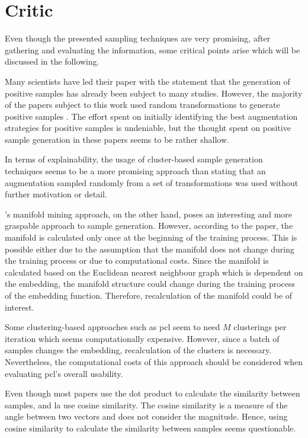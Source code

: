 \section{Critic}\label{sec:critic}

Even though the presented sampling techniques are very promising, after gathering and evaluating the information, 
some critical points arise which will be discussed in the following.

Many scientists have led their paper with the statement that the generation of positive samples has already been subject to many studies.
However, the majority of the papers subject to this work used random transformations to generate positive samples \citet{robinson_contrastive_2021,adversarial_2020,swav_2020}.
The effort spent on initially identifying the best augmentation strategies for positive samples is undeniable, 
but the thought spent on positive sample generation in these papers seems to be rather shallow.

In terms of explainability, 
the usage of cluster-based sample generation techniques seems to be a more promising approach than stating that an augmentation sampled randomly 
from a set of transformations was used without further motivation or detail.

\citet{mining_manifolds_2018}'s manifold mining approach, on the other hand, poses an interesting and more graspable approach to sample generation. 
However, according to the paper, the manifold is calculated only once at the beginning of the training process.
This is possible either due to the assumption that the manifold does not change during the training process or 
due to computational costs.
Since the manifold is calculated based on the Euclidean nearest neighbour graph which is dependent on the embedding, 
the manifold structure could change during the training process of the embedding function.
Therefore, recalculation of the manifold could be of interest.

Some clustering-based approaches such as \ac{pcl} \citet{PCL_2021} seem to need $M$ clusterings per iteration 
which seems computationally expensive. 
However, since a batch of samples changes the embedding, recalculation of the clusters is necessary.
Nevertheless, the computational costs of this approach should be considered when evaluating \ac{pcl}'s overall usability.

Even though most papers use the dot product to calculate the similarity between samples, 
\citet{mining_potential_2024} and \ac{la} \citet{local_aggr_2019} use cosine similarity.
The cosine similarity is a measure of the angle between two vectors and does not consider the magnitude.
Hence, using cosine similarity to calculate the similarity between samples seems questionable.

